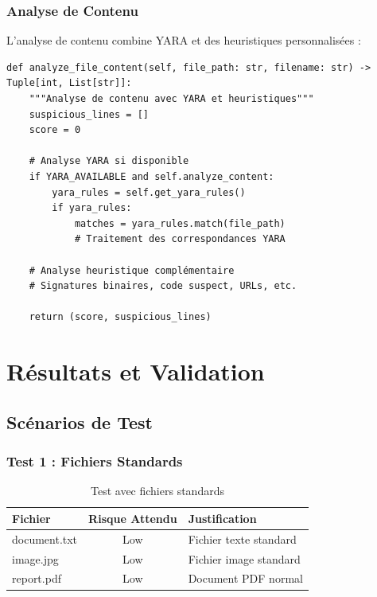 \documentclass[12pt,a4paper]{report}
\begin{document}
\subsection{Analyse de Contenu}

L'analyse de contenu combine YARA et des heuristiques personnalisées :

\begin{lstlisting}[caption={Analyse de contenu améliorée}]
def analyze_file_content(self, file_path: str, filename: str) -> Tuple[int, List[str]]:
    """Analyse de contenu avec YARA et heuristiques"""
    suspicious_lines = []
    score = 0
    
    # Analyse YARA si disponible
    if YARA_AVAILABLE and self.analyze_content:
        yara_rules = self.get_yara_rules()
        if yara_rules:
            matches = yara_rules.match(file_path)
            # Traitement des correspondances YARA
    
    # Analyse heuristique complémentaire
    # Signatures binaires, code suspect, URLs, etc.
    
    return (score, suspicious_lines)
\end{lstlisting}

\chapter{Résultats et Validation}

\section{Scénarios de Test}

\subsection{Test 1 : Fichiers Standards}

\begin{table}[h]
\centering
\begin{tabular}{|l|c|l|}
\hline
\textbf{Fichier} & \textbf{Risque Attendu} & \textbf{Justification} \\
\hline
document.txt & Low & Fichier texte standard \\
image.jpg & Low & Fichier image standard \\
report.pdf & Low & Document PDF normal \\
\hline
\end{tabular}
\caption{Test avec fichiers standards}
\end{table}
\end{document}
